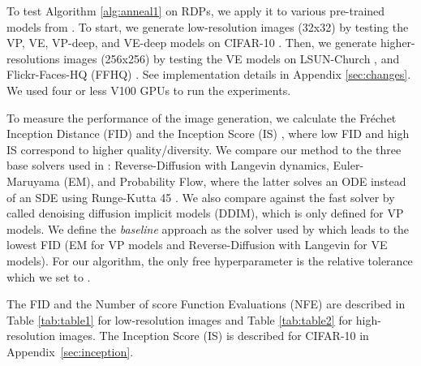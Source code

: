 \documentclass{article}
\begin{document}
To test Algorithm \ref{alg:anneal1} on RDPs, we apply it to various pre-trained models from \citet{song2020score}. To start, we generate low-resolution images (32x32) by testing the VP, VE, VP-deep, and VE-deep models on CIFAR-10 \citep{krizhevsky2009learning}. Then, we generate higher-resolutions images (256x256) by testing the VE models on LSUN-Church \citep{yu2015lsun}, and Flickr-Faces-HQ (FFHQ) \citep{karras2019style}. See implementation details in Appendix \ref{sec:changes}.
We used four or less V100 GPUs to run the experiments.

To measure the performance of the image generation, we calculate the Fréchet Inception Distance (FID) \citep{heusel2017gans} and the Inception Score (IS) \citep{salimans2016improved}, where low FID and high IS correspond to higher quality/diversity. 
We compare our method to the three base solvers used in \citet{song2020score}: Reverse-Diffusion with Langevin dynamics, Euler-Maruyama (EM), and Probability Flow, where the latter solves an ODE instead of an SDE using Runge-Kutta 45 \citep{dormand1980family}. We also compare against the fast solver by \citep{song2020denoising} called denoising diffusion implicit models (DDIM), which is only defined for VP models. We define the {\em baseline} approach as the solver used by \citet{song2020score} which leads to the lowest FID (EM for VP models and Reverse-Diffusion with Langevin for VE models). For our algorithm, the only free hyperparameter is the relative tolerance which we set to . 

The FID and the Number of score Function Evaluations (NFE) are described in Table \ref{tab:table1} for low-resolution images and Table \ref{tab:table2} for high-resolution images. The Inception Score (IS) is described for CIFAR-10 in Appendix~\ref{sec:inception}. 
\end{document}
